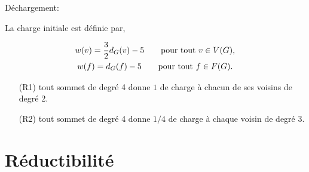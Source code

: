 \documentclass{beamer}
\newtheorem{lemme}{Lemme}
\begin{document}
\begin{frame}
Déchargement:

La charge initiale est définie par,

$$
\gathered
w(v) = \frac{3}{2} d_G(v) - 5 \qquad \textrm{pour tout $v\in V(G)$,} \\
w(f) = d_G(f) - 5 \qquad \textrm{pour tout $f\in F(G)$.}
\endgathered
$$



%
%
%
\begin{enumerate}
\item[(R1)] tout sommet de degré 4 donne $1$ de charge à chacun de ses voisins de degré 2.
\item[(R2)] tout sommet de degré 4 donne $1/4$ de charge à chaque voisin de degré 3.
\end{enumerate}
\end{frame}


\section{Réductibilité}
\subsection{ }
%  
%
\end{document}
